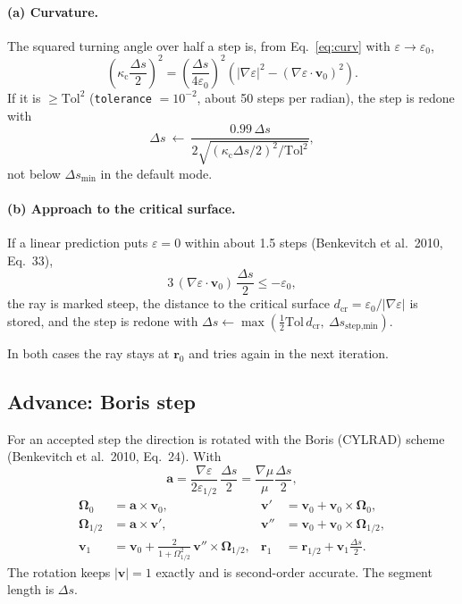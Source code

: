 \documentclass[11pt,a4paper]{article}
\newcommand{\code}[1]{\texttt{#1}}
\newcommand{\vect}[1]{\bm{#1}}
\begin{document}
\paragraph{(a) Curvature.} The squared turning angle over half a step is, from Eq.~\eqref{eq:curv}
with $\varepsilon\to\varepsilon_0$,
\begin{equation}
  \left(\kappa_\text{c}\frac{\Delta s}{2}\right)^2=\left(\frac{\Delta s}{4\varepsilon_0}\right)^2
  \left(|\nabla\varepsilon|^2-(\nabla\varepsilon\cdot\vect v_0)^2\right).
\end{equation}
If it is $\ge\text{Tol}^2$ (\code{tolerance} $=10^{-2}$, about 50 steps per radian), the step is
redone with
\begin{equation}
  \Delta s\ \leftarrow\ \frac{0.99\,\Delta s}{2\sqrt{(\kappa_\text{c}\Delta s/2)^2/\text{Tol}^2}},
\end{equation}
not below $\Delta s_\text{min}$ in the default mode.

\paragraph{(b) Approach to the critical surface.} If a linear prediction puts $\varepsilon=0$
within about 1.5 steps (Benkevitch et al.\ 2010, Eq.~33),
\begin{equation}
  3\,(\nabla\varepsilon\cdot\vect v_0)\,\frac{\Delta s}{2}\le-\varepsilon_0,
  \label{eq:steep}
\end{equation}
the ray is marked steep, the distance to the critical surface
$d_\text{cr}=\varepsilon_0/|\nabla\varepsilon|$ is stored, and the step is redone with
$\Delta s\leftarrow\max(\tfrac12\text{Tol}\,d_\text{cr},\ \Delta s_\text{step,min})$.

In both cases the ray stays at $\vect r_0$ and tries again in the next iteration.

\subsection{Advance: Boris step}\label{sec:boris}
For an accepted step the direction is rotated with the Boris (CYLRAD) scheme (Benkevitch et al.\
2010, Eq.~24). With
\begin{equation}
  \vect a=\frac{\nabla\varepsilon}{2\varepsilon_{1/2}}\,\frac{\Delta s}{2}=\frac{\nabla\mu}{\mu}\frac{\Delta s}{2},
\end{equation}
\begin{align}
  \vect\Omega_0&=\vect a\times\vect v_0, & \vect v'&=\vect v_0+\vect v_0\times\vect\Omega_0,\nonumber\\
  \vect\Omega_{1/2}&=\vect a\times\vect v', & \vect v''&=\vect v_0+\vect v_0\times\vect\Omega_{1/2},\nonumber\\
  \vect v_1&=\vect v_0+\frac{2}{1+\Omega_{1/2}^2}\,\vect v''\times\vect\Omega_{1/2}, &
  \vect r_1&=\vect r_{1/2}+\vect v_1\frac{\Delta s}{2}.
\end{align}
The rotation keeps $|\vect v|=1$ exactly and is second-order accurate. The segment length is
$\Delta s$.
\end{document}
